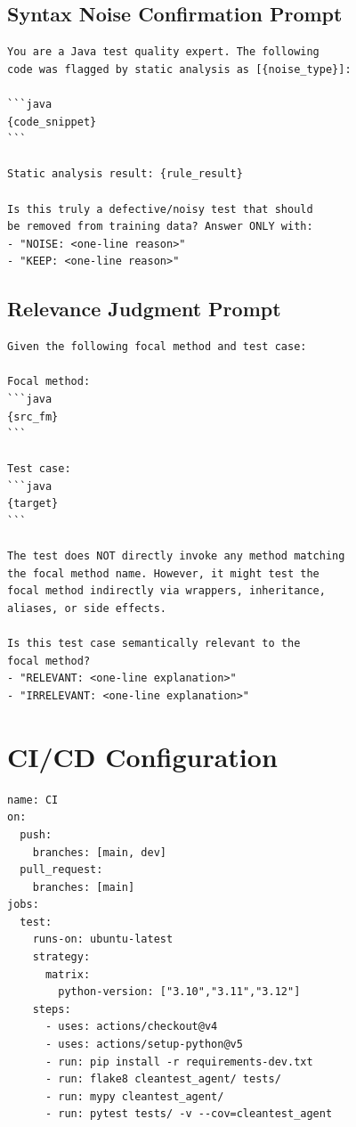 \documentclass[acmlarge,nonacm,screen]{acmart}
\begin{document}
\subsection{Syntax Noise Confirmation Prompt}

\begin{lstlisting}[language={},breaklines=true]
You are a Java test quality expert. The following
code was flagged by static analysis as [{noise_type}]:

```java
{code_snippet}
```

Static analysis result: {rule_result}

Is this truly a defective/noisy test that should
be removed from training data? Answer ONLY with:
- "NOISE: <one-line reason>"
- "KEEP: <one-line reason>"
\end{lstlisting}

\subsection{Relevance Judgment Prompt}

\begin{lstlisting}[language={},breaklines=true]
Given the following focal method and test case:

Focal method:
```java
{src_fm}
```

Test case:
```java
{target}
```

The test does NOT directly invoke any method matching
the focal method name. However, it might test the
focal method indirectly via wrappers, inheritance,
aliases, or side effects.

Is this test case semantically relevant to the
focal method?
- "RELEVANT: <one-line explanation>"
- "IRRELEVANT: <one-line explanation>"
\end{lstlisting}


\section{CI/CD Configuration}
\label{appendix:cicd}

\begin{lstlisting}[language={},caption={GitHub Actions CI configuration}]
name: CI
on:
  push:
    branches: [main, dev]
  pull_request:
    branches: [main]
jobs:
  test:
    runs-on: ubuntu-latest
    strategy:
      matrix:
        python-version: ["3.10","3.11","3.12"]
    steps:
      - uses: actions/checkout@v4
      - uses: actions/setup-python@v5
      - run: pip install -r requirements-dev.txt
      - run: flake8 cleantest_agent/ tests/
      - run: mypy cleantest_agent/
      - run: pytest tests/ -v --cov=cleantest_agent
\end{lstlisting}
\end{document}
